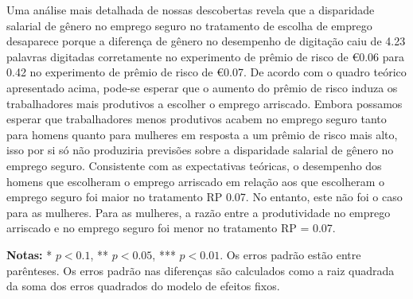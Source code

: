 \documentclass[a4paper,12pt]{article}[abntex2]
\begin{document}
Uma análise mais detalhada de nossas descobertas revela que a disparidade salarial de gênero no emprego seguro no tratamento de escolha de emprego desaparece porque a diferença de gênero no desempenho de digitação caiu de 4.23 palavras digitadas corretamente no experimento de prêmio de risco de €0.06 para 0.42 no experimento de prêmio de risco de €0.07. De acordo com o quadro teórico apresentado acima, pode-se esperar que o aumento do prêmio de risco induza os trabalhadores mais produtivos a escolher o emprego arriscado. Embora possamos esperar que trabalhadores menos produtivos acabem no emprego seguro tanto para homens quanto para mulheres em resposta a um prêmio de risco mais alto, isso por si só não produziria previsões sobre a disparidade salarial de gênero no emprego seguro. Consistente com as expectativas teóricas, o desempenho dos homens que escolheram o emprego arriscado em relação aos que escolheram o emprego seguro foi maior no tratamento RP 0.07. No entanto, este não foi o caso para as mulheres. Para as mulheres, a razão entre a produtividade no emprego arriscado e no emprego seguro foi menor no tratamento RP = 0.07.

\begin{table}[h!]
\centering
\caption{Salário: Prêmio de Risco = 0.06.}
\textbf{Notas:} * \( p < 0.1 \), ** \( p < 0.05 \), *** \( p < 0.01 \). Os erros padrão estão entre parênteses. Os erros padrão nas diferenças são calculados como a raiz quadrada da soma dos erros quadrados do modelo de efeitos fixos.
\end{table}
\end{document}
